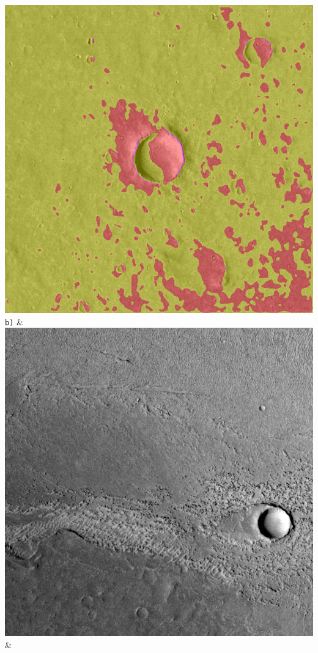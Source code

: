 \begin{table}[h!]
\begin{tabularx}{\textwidth}
		\includegraphics[width=0.9\linewidth]{images/gen/number_of_segments/p03_01.png_100.png} \\
		\texttt{b)} &
		\includegraphics[width=0.9\linewidth]{images/p03/p03_02.png} &

\end{tabularx}
\end{table}
